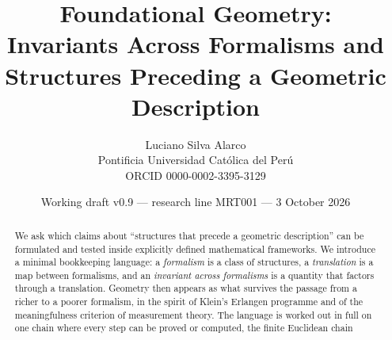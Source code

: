 \documentclass[11pt,a4paper]{article}
\title{\textbf{Foundational Geometry:}\\[2pt]
\large Invariants Across Formalisms and Structures Preceding a Geometric Description}
\author{Luciano Silva Alarco\\
\small Pontificia Universidad Cat\'olica del Per\'u\\
\small ORCID 0000-0002-3395-3129}
\date{\small Working draft v0.9 --- research line MRT001 --- 3 October 2026}
\theoremstyle{plain}
\theoremstyle{definition}
\theoremstyle{remark}
\begin{document}
\maketitle

\begin{abstract}
\noindent
We ask which claims about ``structures that precede a geometric description'' can be formulated and tested inside explicitly defined mathematical frameworks. We introduce a minimal bookkeeping language: a \emph{formalism} is a class of structures, a \emph{translation} is a map between formalisms, and an \emph{invariant across formalisms} is a quantity that factors through a translation. Geometry then appears as what survives the passage from a richer to a poorer formalism, in the spirit of Klein's Erlangen programme and of the meaningfulness criterion of measurement theory. The language is worked out in full on one chain where every step can be proved or computed, the finite Euclidean chain

\end{abstract}
\end{document}
